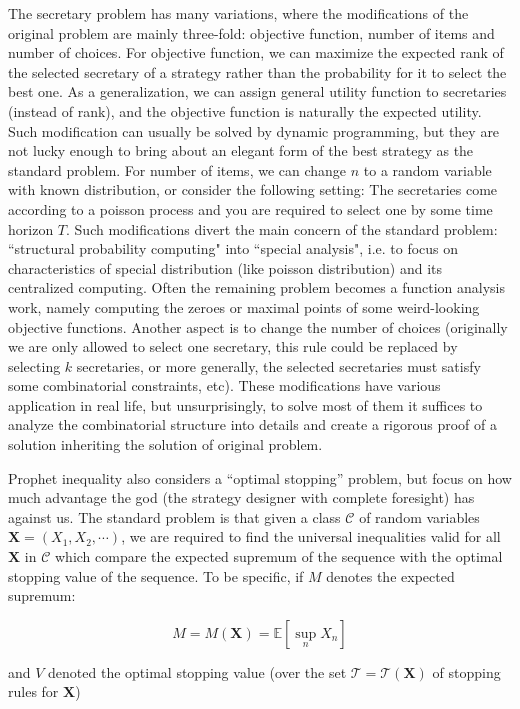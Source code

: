 \documentclass[bachelor]{thuthesis}
\begin{document}
\begin{appendix}
The secretary problem has many variations, where the modifications of the original problem are mainly three-fold: objective function, number of items and number of choices. For objective function, we can maximize the expected rank of the selected secretary of a strategy rather than the probability for it to select the best one. As a generalization, we can assign general utility function to secretaries (instead of rank), and the objective function is naturally the expected utility. Such modification can usually be solved by dynamic programming, but they are not lucky enough to bring about an elegant form of the best strategy as the standard problem. For number of items, we can change $n$ to a random variable with known distribution, or consider the following setting: The secretaries come according to a poisson process and you are required to select one by some time horizon $T$. Such modifications divert the main concern of the standard problem: ``structural probability computing" into ``special analysis", i.e. to focus on characteristics of special distribution (like poisson distribution) and its centralized computing. Often the remaining problem becomes a function analysis work, namely computing the zeroes or maximal points of some weird-looking objective functions. Another aspect is to change the number of choices (originally we are only allowed to select one secretary, this rule could be replaced by selecting $k$ secretaries, or more generally, the selected secretaries must satisfy some combinatorial constraints, etc). These modifications have various application in real life, but unsurprisingly, to solve most of them it suffices to analyze the combinatorial structure into details and create a rigorous proof of a solution inheriting the solution of original problem.

Prophet inequality also considers a ``optimal stopping'' problem, but focus on how much advantage the god (the strategy designer with complete foresight) has against us. The standard problem is that given a class $\mathcal{C}$ of random variables $\textbf{X}=(X_1,X_2,\cdots)$, we are required to find the universal inequalities valid for all $\textbf{X}$ in $\mathcal{C}$ which compare the expected supremum of the sequence with the optimal stopping value of the sequence. To be specific, if $M$ denotes the expected supremum:

\[M=M(\textbf{X})=\mathbb{E}[\sup_{n}X_n]\]

and $V$ denoted the optimal stopping value (over the set $\mathcal{T}=\mathcal{T}(\textbf{X})$ of stopping rules for $\textbf{X}$)


\end{appendix}
\end{document}
